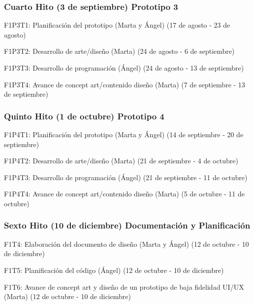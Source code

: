 \subsubsection{Cuarto Hito (3 de septiembre) Prototipo 3}

\begin{compactitem}
\item F1P3T1: Planificación del prototipo (Marta y Ángel) (17 de agosto - 23 de agosto)
\item F1P3T2: Desarrollo de arte/diseño (Marta) (24 de agosto - 6 de septiembre)
\item F1P3T3: Desarrollo de programación (Ángel) (24 de agosto - 13 de septiembre)
\item F1P3T4: Avance de concept art/contenido diseño (Marta) (7 de septiembre - 13 de septiembre)
\end{compactitem}


\subsubsection{Quinto Hito (1 de octubre) Prototipo 4}

\begin{compactitem}
\item F1P4T1: Planificación del prototipo (Marta y Ángel) (14 de septiembre - 20 de septiembre)
\item F1P4T2: Desarrollo de arte/diseño (Marta) (21 de septiembre - 4 de octubre)
\item F1P4T3: Desarrollo de programación (Ángel) (21 de septiembre - 11 de octubre)
\item F1P4T4: Avance de concept art/contenido diseño (Marta) (5 de octubre - 11 de octubre)
\end{compactitem}


\subsubsection{Sexto Hito (10 de diciembre) Documentación y Planificación}

\begin{compactitem}
\item F1T4: Elaboración del documento de diseño (Marta y Ángel) (12 de octubre - 10 de diciembre)
\item F1T5: Planificación del código (Ángel) (12 de octubre - 10 de diciembre)
\item F1T6: Avance de concept art y diseño de un prototipo de baja fidelidad UI/UX (Marta) (12 de octubre - 10 de diciembre)
\end{compactitem}


